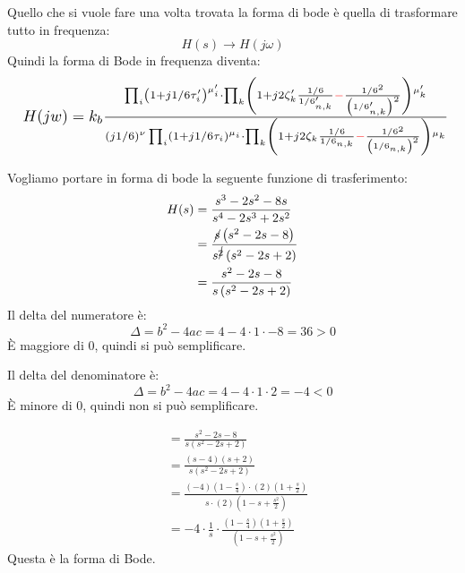 \documentclass[a4paper]{article}
\begin{document}
\vspace{1em}
\noindent
Quello che si vuole fare una volta trovata la forma di bode è quella di 
trasformare tutto in frequenza:
\[
H(s) \to H(j \omega)
\] 
Quindi la forma di Bode in frequenza diventa:
\[
  \resizebox{1\hsize}{!}{
    $
  H(jw) = k_b \frac{
    \prod_i \left( 1 + j \omega \tau'_i \right)^{\mu'_i} \cdot \prod_k \left( 1 + j2 \zeta'_k
    \frac{\omega}{\omega'_{n,k}} \color{red}-\color{black} \frac{\omega^2}{\left( \omega'_{n,k} \right) ^2} \right)^{\mu'_k}
  }{
    \left( j \omega \right)^{\nu} \prod_i \left( 1 + j \omega \tau_i \right)^{\mu_i} \cdot
    \prod_k \left( 1 + j2 \zeta_k \frac{\omega}{\omega_{n,k}} \color{red}-\color{black} \frac{\omega^2}{\left( \omega_{n,k} \right)^2} \right)^{\mu_k}
  }
$}
\] 
\begin{example}
  Vogliamo portare in forma di bode la seguente funzione di trasferimento:
  \[
    \begin{aligned}
      H(s) &= \frac{
        s^3 - 2s^2 - 8s
      }{
        s^4 - 2s^3 + 2s^2
      }\\
      &= \frac{
        \cancel{s} \left( s^2 - 2s - 8 \right)
      }{
        s^{\cancel{2}} \left( s^2 - 2s + 2 \right)
      }\\
      &= \frac{
        s^2 - 2s - 8
      }{
        s \left( s^2 - 2s + 2 \right)
      }
    \end{aligned}
  \] 
  Il delta del numeratore è:
  \[
  \Delta = b^2 - 4ac = 4 - 4 \cdot 1 \cdot -8 = 36 > 0
  \] 
  È maggiore di 0, quindi si può semplificare.

  Il delta del denominatore è:
  \[
  \Delta = b^2 - 4ac = 4 - 4 \cdot 1 \cdot 2 = -4 < 0
  \]
  È minore di 0, quindi non si può semplificare.

  \[
  \begin{aligned}
      &= \frac{
        s^2 - 2s - 8
      }{
        s \left( s^2 - 2s + 2 \right)
      }\\
      &= \frac{
        \left( s-4 \right) \left( s+2 \right)
      }{
        s \left( s^2 - 2s + 2 \right)
      }\\
      &= \frac{
        (-4) \left( 1 - \frac{s}{4} \right) \cdot (2) \left( 1 + \frac{s}{2} \right)
      }{
        s \cdot (2) \left( 1 - s + \frac{s^2}{2} \right) 
      }\\
      &= -4 \cdot \frac{1}{s} \cdot \frac{
        \left( 1 - \frac{s}{4} \right) \left( 1 + \frac{s}{2} \right)
      }{
        \left( 1 - s + \frac{s^2}{2} \right)
      }
  \end{aligned}
  \] 
  Questa è la forma di Bode.


\end{example}
\end{document}
